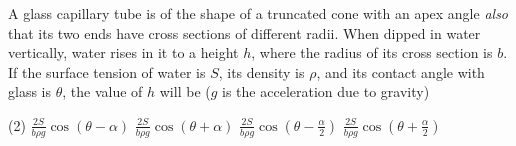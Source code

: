 
\item A glass capillary tube is of the shape of a truncated cone with an apex angle \emph{also} that its two ends have cross sections of different radii. When dipped in water vertically, water rises in it to a height \( h \), where the radius of its cross section is \( b \). If the surface tension of water is \( S \), its density is \( \rho \), and its contact angle with glass is \( \theta \), the value of \( h \) will be (\( g \) is the acceleration due to gravity)
    \begin{center}
    \end{center}
    \begin{tasks}(2)
        \task \(\frac{2S}{b\rho g}\cos(\theta - \alpha)\)
        \task \(\frac{2S}{b\rho g}\cos(\theta + \alpha)\)
        \task \(\frac{2S}{b\rho g}\cos(\theta - \frac{\alpha}{2})\)
        \task \(\frac{2S}{b\rho g}\cos(\theta + \frac{\alpha}{2})\)
    \end{tasks}
